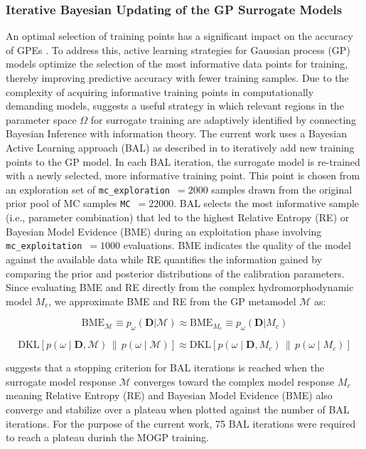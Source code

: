 \documentclass[draft,linenumbers,onecolumn]{agujournal2019} %
\begin{document}
\subsubsection{Iterative Bayesian Updating of the GP Surrogate Models}
\label{subsec:sec2.6.3}
An optimal selection of training points has a significant impact on the accuracy of GPEs \cite{sinsbeck2017sequential}. To address this, active learning strategies for Gaussian process (GP) models optimize the selection of the most informative data points for training, thereby improving predictive accuracy with fewer training samples. Due to the complexity of acquiring informative training points in computationally demanding models,  suggests a useful strategy in which relevant regions in the parameter space $\Omega$ for surrogate training are adaptively identified by connecting Bayesian Inference with information theory. The current work uses a Bayesian Active Learning approach (BAL) as described in  to iteratively add new training points to the GP model. In each BAL iteration, the surrogate model is re-trained with a newly selected, more informative training point. This point is chosen from an exploration set of \texttt{mc\_exploration}~$= 2000$ samples drawn from the original prior pool of MC samples \texttt{MC}~$= 22000$. BAL selects the most informative sample (i.e., parameter combination) that led to the highest Relative Entropy (RE) or Bayesian Model Evidence (BME) during an exploitation phase involving \texttt{mc\_exploitation}~$= 1000$ evaluations. BME indicates the quality of the model against the available data while RE quantifies the information gained by comparing the prior and posterior distributions of the calibration parameters. Since evaluating BME and RE directly from the complex hydromorphodynamic model $M_c$, we approximate BME and RE from the GP metamodel $\mathcal{M}$ as:

\[
\text{BME}_{\mathcal{M}} \equiv p_{\omega}(\mathbf{D}|\mathcal{M}) \approx \text{BME}_{M_c} \equiv p_{\omega}(\mathbf{D}|M_c)
\]

\[
\text{DKL}\left[ p(\omega \mid \mathbf{D}, \mathcal{M}) \,\|\, p(\omega \mid \mathcal{M}) \right] \approx \text{DKL}\left[ p(\omega \mid \mathbf{D}, M_c) \,\|\, p(\omega \mid M_c) \right]
\]

 suggests that a stopping criterion for BAL iterations is reached when the surrogate model response $\mathcal{M}$ converges toward the complex model response $M_c$ meaning Relative Entropy (RE) and Bayesian Model Evidence (BME) also converge and stabilize over a plateau when plotted against the number of BAL iterations. For the purpose of the current work, 75 BAL iterations were required to reach a plateau durinh the MOGP training. 
\end{document}
